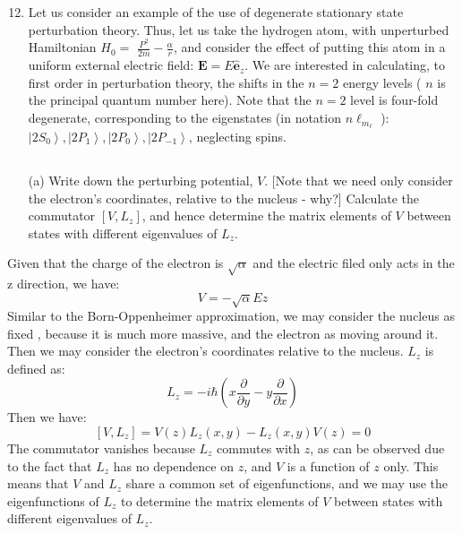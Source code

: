 \documentclass[12pt]{article}
\begin{document}
\section{}
\begin{enumerate}
  \setcounter{enumi}{11}
  \item Let us consider an example of the use of degenerate stationary state perturbation theory. Thus, let us take the hydrogen atom, with unperturbed Hamiltonian $H_{0}=$ $\frac{P^{2}}{2 m}-\frac{\alpha}{r}$, and consider the effect of putting this atom in a uniform external electric field: $\mathbf{E}=E \hat{\mathbf{e}}_{z}$. We are interested in calculating, to first order in perturbation theory, the shifts in the $n=2$ energy levels ( $n$ is the principal quantum number here). Note that the $n=2$ level is four-fold degenerate, corresponding to the eigenstates (in notation $n \ell_{m_{\ell}}$ ): $\left|2 S_{0}\right\rangle,\left|2 P_{1}\right\rangle,\left|2 P_{0}\right\rangle,\left|2 P_{-1}\right\rangle$, neglecting spins.
\subsection{}
(a) Write down the perturbing potential, $V$. [Note that we need only consider the electron's coordinates, relative to the nucleus - why?] Calculate the commutator $\left[V, L_{z}\right]$, and hence determine the matrix elements of $V$ between states with different eigenvalues of $L_{z}$.
\end{enumerate}
Given that the charge of the electron is $\sqrt{\alpha }$ and the electric filed only acts in the z direction, we have:
\begin{equation}
  V = -\sqrt{\alpha} E z
\end{equation}
Similar to the Born-Oppenheimer approximation, we may consider the nucleus as fixed , because it is much more massive, and the electron as moving around it. Then we may consider the electron's coordinates relative to the nucleus. $L_z$ is defined as:
\begin{equation}
  L_z = -i\hbar \left( x \frac{\partial}{\partial y} - y \frac{\partial}{\partial x} \right)
\end{equation}
Then we have:
\begin{equation}
  \left[V, L_{z}\right] = V(z)L_z(x,y) - L_z(x,y)V(z) = 0
\end{equation}
The commutator vanishes because $L_z$ commutes with $z$, as can be observed due to the fact that $L_z$ has no dependence on $z$, and $V$ is a function of $z$ only. This means that $V$ and $L_z$ share a common set of eigenfunctions, and we may use the eigenfunctions of $L_z$ to determine the matrix elements of $V$ between states with different eigenvalues of $L_z$. \\
\end{document}

